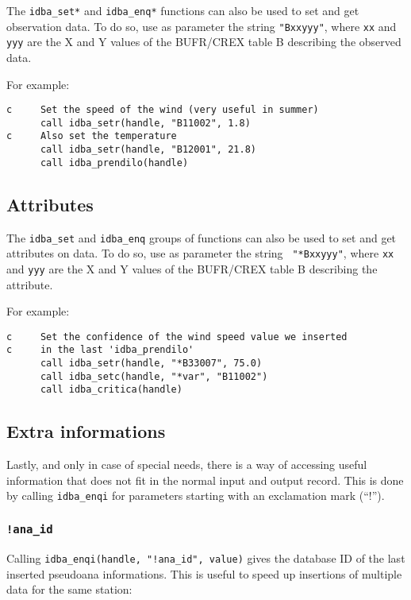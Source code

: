 \documentclass[final,12pt,a4paper,twoside]{book}
\begin{document}
The {\tt idba\_set*} and {\tt idba\_enq*} functions can also be used to set and get
observation data.  To do so, use as parameter the string {\tt "Bxxyyy"}, where
{\tt xx} and {\tt yyy} are the X and Y values of the BUFR/CREX table B describing
the observed data.

For example:

\begin{verbatim}
c     Set the speed of the wind (very useful in summer)
      call idba_setr(handle, "B11002", 1.8)
c     Also set the temperature
      call idba_setr(handle, "B12001", 21.8)
      call idba_prendilo(handle)
\end{verbatim}


\subsection{Attributes}

The {\tt idba\_set} and {\tt idba\_enq} groups of functions can also be used to
set and get attributes on data.  To do so, use as parameter the string {\tt
"*Bxxyyy"}, where {\tt xx} and {\tt yyy} are the X and Y values of the
BUFR/CREX table B describing the attribute.

For example:

\begin{verbatim}
c     Set the confidence of the wind speed value we inserted
c     in the last 'idba_prendilo'
      call idba_setr(handle, "*B33007", 75.0)
      call idba_setc(handle, "*var", "B11002")
      call idba_critica(handle)
\end{verbatim}

\subsection{Extra informations}

Lastly, and only in case of special needs, there is a way of accessing useful
information that does not fit in the normal input and output record.  This is
done by calling {\tt idba\_enqi} for parameters starting with an exclamation
mark (``!'').

\subsubsection{{\tt !ana\_id}}

Calling {\tt idba\_enqi(handle, "!ana\_id", value)} gives the database ID of
the last inserted pseudoana informations.  This is useful to speed up
insertions of multiple data for the same station:
\end{document}
